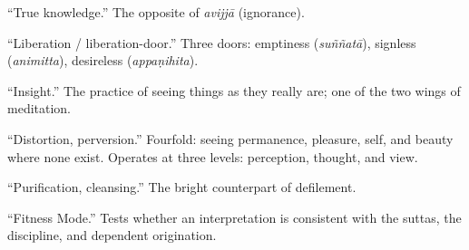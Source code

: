 \begin{description}[style=nextline, labelwidth=3.5cm, leftmargin=3.8cm, font=\itshape]
\item[vijjā] ``True knowledge.'' The opposite of \textit{avijjā} (ignorance).

\item[vimokkha / vimokkhamukha] ``Liberation / liberation-door.'' Three doors: emptiness (\textit{suññatā}), signless (\textit{animitta}), desireless (\textit{appaṇihita}).

\item[vipassanā] ``Insight.'' The practice of seeing things as they really are; one of the two wings of meditation.

\item[vipallāsa] ``Distortion, perversion.'' Fourfold: seeing permanence, pleasure, self, and beauty where none exist. Operates at three levels: perception, thought, and view.

\item[vodāna] ``Purification, cleansing.'' The bright counterpart of defilement.

\item[yuttihāra] ``Fitness Mode.'' Tests whether an interpretation is consistent with the suttas, the discipline, and dependent origination.

\end{description}
